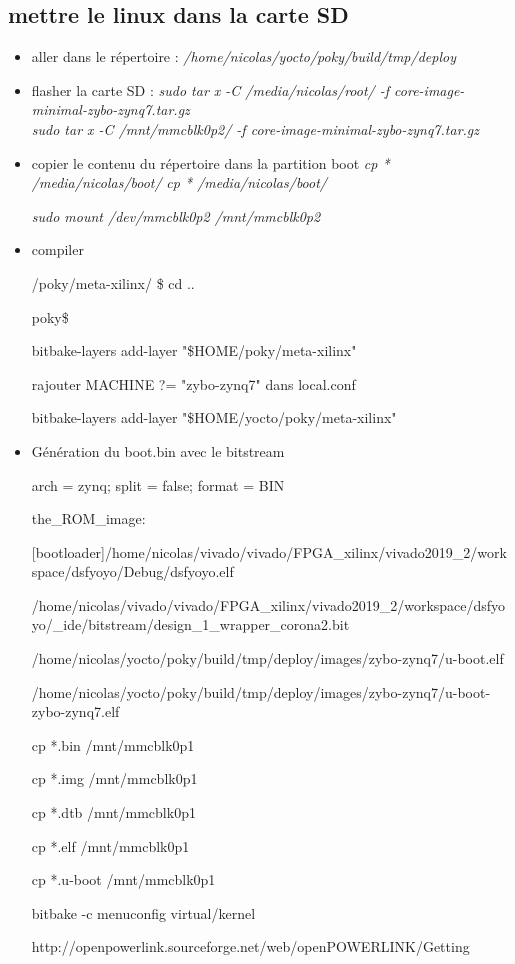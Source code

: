 \subsection{mettre le linux dans la carte SD}
\begin{itemize}
\item 
aller dans le répertoire : 
\textit{/home/nicolas/yocto/poky/build/tmp/deploy}
\item 
flasher la carte SD : 
\textit{sudo tar x -C /media/nicolas/root/ -f core-image-minimal-zybo-zynq7.tar.gz}
\\\textit{sudo tar x -C /mnt/mmcblk0p2/ -f core-image-minimal-zybo-zynq7.tar.gz}

\item 
copier le contenu du répertoire dans la partition boot
\textit{cp * /media/nicolas/boot/}
\textit{cp * /media/nicolas/boot/}

\textit{sudo mount /dev/mmcblk0p2 /mnt/mmcblk0p2}


\item compiler

/poky/meta-xilinx/ \$ cd ..

poky\$

bitbake-layers add-layer "\$HOME/poky/meta-xilinx"

rajouter MACHINE ?= "zybo-zynq7" dans local.conf

bitbake-layers add-layer "\$HOME/yocto/poky/meta-xilinx"


\item Génération du boot.bin avec le bitstream

arch = zynq; split = false; format = BIN

the\_ROM\_image:

{

[bootloader]/home/nicolas/vivado/vivado/FPGA\_xilinx/vivado2019\_2/workspace/dsfyoyo/Debug/dsfyoyo.elf

/home/nicolas/vivado/vivado/FPGA\_xilinx/vivado2019\_2/workspace/dsfyoyo/\_ide/bitstream/design\_1_wrapper_corona2.bit

/home/nicolas/yocto/poky/build/tmp/deploy/images/zybo-zynq7/u-boot.elf

/home/nicolas/yocto/poky/build/tmp/deploy/images/zybo-zynq7/u-boot-zybo-zynq7.elf

}

cp *.bin /mnt/mmcblk0p1

cp *.img /mnt/mmcblk0p1

cp *.dtb /mnt/mmcblk0p1

cp *.elf /mnt/mmcblk0p1

cp *.u-boot /mnt/mmcblk0p1


bitbake -c menuconfig virtual/kernel



http://openpowerlink.sourceforge.net/web/openPOWERLINK/Getting%
\end{itemize}

